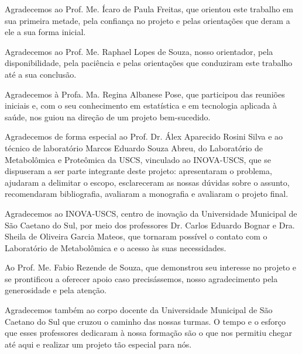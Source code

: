 
\begin{agradecimentos}

Agradecemos ao Prof. Me. Ícaro de Paula Freitas, que orientou este trabalho em sua primeira metade, pela confiança no projeto e pelas orientações que deram a ele a sua forma inicial.

Agradecemos ao Prof. Me. Raphael Lopes de Souza, nosso orientador, pela disponibilidade, pela paciência e pelas orientações que conduziram este trabalho até a sua conclusão.

Agradecemos à Profa. Ma. Regina Albanese Pose, que participou das reuniões iniciais e, com o seu conhecimento em estatística e em tecnologia aplicada à saúde, nos guiou na direção de um projeto bem-sucedido.

Agradecemos de forma especial ao Prof. Dr. Álex Aparecido Rosini Silva e ao técnico de laboratório Marcos Eduardo Souza Abreu, do Laboratório de Metabolômica e Proteômica da USCS, vinculado ao INOVA-USCS, que se dispuseram a ser parte integrante deste projeto: apresentaram o problema, ajudaram a delimitar o escopo, esclareceram as nossas dúvidas sobre o assunto, recomendaram bibliografia, avaliaram a monografia e avaliaram o projeto final.

Agradecemos ao INOVA-USCS, centro de inovação da Universidade Municipal de São Caetano do Sul, por meio dos professores Dr. Carlos Eduardo Bognar e Dra. Sheila de Oliveira Garcia Mateos, que tornaram possível o contato com o Laboratório de Metabolômica e o acesso às suas necessidades.

Ao Prof. Me. Fabio Rezende de Souza, que demonstrou seu interesse no projeto e se prontificou a oferecer apoio caso precisássemos, nosso agradecimento pela generosidade e pela atenção.

Agradecemos também ao corpo docente da Universidade Municipal de São Caetano do Sul que cruzou o caminho das nossas turmas. O tempo e o esforço que esses professores dedicaram à nossa formação são o que nos permitiu chegar até aqui e realizar um projeto tão especial para nós.

\end{agradecimentos}


